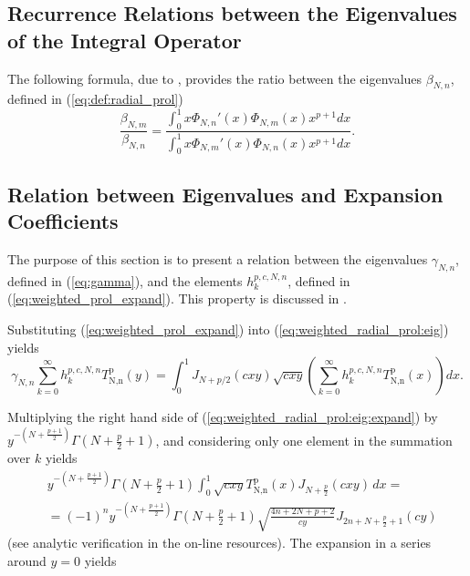 \documentclass[12pt]{article}
\begin{document}
%
%
%
\subsection{Recurrence Relations between the Eigenvalues of the Integral Operator}

The following formula, due to \cite{serkh2015generalized,greengard2017generalized}, provides the ratio between the eigenvalues $\beta_{N,n}$, defined in (\ref{eq:def:radial_prol})
\begin{equation}\label{eq:eig:rec}
  \frac{\beta_{N,m}}{\beta_{N,n}} = \frac{\int_0^1 x \Phi_{N,n}'(x) \Phi_{N,m}(x) x^{p+1} dx }{\int_0^1 x \Phi_{N,m}'(x) \Phi_{N,n}(x) x^{p+1} dx} .
\end{equation}


%
%
%
\subsection{Relation between Eigenvalues and Expansion Coefficients}

The purpose of this section is to present a relation between the eigenvalues $\gamma_{N,n}$, defined in (\ref{eq:gamma}), and the elements ${h}^{p,c,N,n}_k$, defined in (\ref{eq:weighted_prol_expand}). 
This property is discussed in \cite{slepian1964prolate,serkh2015generalized,greengard2017generalized}.


Substituting (\ref{eq:weighted_prol_expand}) into (\ref{eq:weighted_radial_prol:eig}) yields
\begin{equation}\label{eq:weighted_radial_prol:eig:expand}
  \gamma_{N,n} \sum_{k=0}^{\infty} {h}^{p,c,N,n}_k T_{\text{N,n}}^{\text{p}}(y) = \int_0^1 {J_{N+p/2}(cxy)} \sqrt{cxy} \left(\sum_{k=0}^{\infty} {h}^{p,c,N,n}_k T_{\text{N,n}}^{\text{p}}(x) \right) dx .
\end{equation}

Multiplying the right hand side of (\ref{eq:weighted_radial_prol:eig:expand}) by $y^{-\left(N+\frac{p+1}{2}\right)} \Gamma \left(N+\frac{p}{2}+1\right)$, and considering only one element in the summation over $k$ yields
\begin{equation}\label{eq:expand-eig:rhs}
\begin{split}
& y^{-\left(N+\frac{p+1}{2}\right)} \Gamma \left(N+\frac{p}{2}+1\right) \int_0^1 \sqrt{c x y} T_{\text{N,n}}^{\text{p}}(x) J_{N+\frac{p}{2}}(c x y) \, dx = \\
& = (-1)^n y^{-\left(N+\frac{p+1}{2}\right)} \Gamma \left(N+\frac{p}{2}+1\right) \sqrt{\frac{4 n+2 N+p+2}{c y}} J_{2 n+N+\frac{p}{2}+1}(c y) 
\end{split}
\end{equation}
(see analytic verification in the on-line resources). 
The expansion in a series around $y=0$ yields
\end{document}
